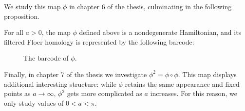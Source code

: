 We study this map $\phi$ in chapter 6 of the thesis, culminating in the following proposition.
\begin{prop}
For all $a > 0$, the map $\phi$ defined above is a nondegenerate Hamiltonian, and its filtered Floer homology is represented by the following barcode:
\begin{figure}[H]
\centering
{}
\caption{The barcode of $\phi$.}
\end{figure}
\end{prop}

Finally, in chapter 7 of the thesis we investigate $\phi^2 = \phi \circ \phi$. This map displays additional interesting structure: while $\phi$ retains the same appearance and fixed points as $a \to \infty$, $\phi^2$ gets more complicated as $a$ increases. For this reason, we only study values of $0 < a < \pi$.

